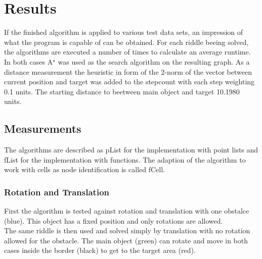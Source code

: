 \chapter{Results}
If the finished algorithm is applied to various test data sets, an impression of what the program is capable of can be obtained.
For each riddle beeing solved, the algorithms are executed a number of times to calculate an average runtime.\\
In both cases A$^\star$ was used as the search algorithm on the resulting graph. As a distance measurement the heuristic in form of the 2-norm of the vector between current position and target was added to the stepcount with each step weighting 0.1 units. The starting distance to beetween main object and target 10.1980 units.
\section{Measurements}
The algorithms are described as pList for the implementation with point lists and fList for the implementation with functions. The adaption of the algorithm to work with cells as node identification is called fCell.
\subsection{Rotation and Translation}
First the algorithm is tested against rotation and translation with one obstalce (blue). This object has a fixed position and only rotations are allowed.\\
The same riddle is then used and solved simply by translation with no rotation allowed for the obstacle. The main object (green) can rotate and move in both cases inside the border (black) to get to the target area (red).

